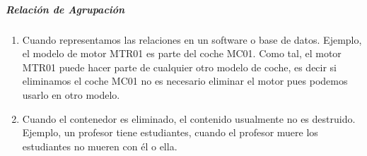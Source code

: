 \subparagraph*{Relación de Agrupación}

\begin{enumerate}
    \item Cuando representamos las relaciones en un software o base de datos. Ejemplo, el modelo de motor MTR01 es parte del coche MC01. Como tal, el motor MTR01 puede hacer parte de cualquier otro modelo de coche, es decir si eliminamos el coche MC01 no es necesario eliminar el motor pues podemos usarlo en otro modelo.
    \item Cuando el contenedor es eliminado, el contenido usualmente no es destruido. Ejemplo, un profesor tiene estudiantes, cuando el profesor muere los estudiantes no mueren con él o ella.
\end{enumerate}